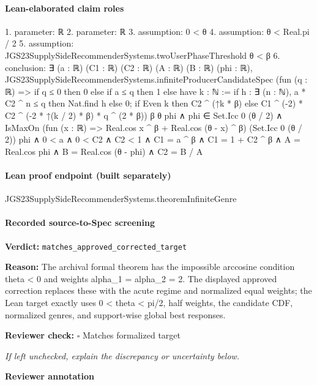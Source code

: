 \documentclass[10pt]{article}
\newcommand{\reviewerbox}{%
  \par\noindent\fbox{\parbox{0.96\linewidth}{\rule{0pt}{0.38in}}}\par
}
\newcommand{\reviewmatch}[1]{%
  \par\noindent\textbf{Reviewer check:} $\square$\; #1\par
  \noindent\emph{If left unchecked, explain the discrepancy or uncertainty below.}\par
}
\begin{document}
\paragraph{Lean-elaborated claim roles}\begin{ReviewVerbatim}
1. parameter: ℝ
2. parameter: ℝ
3. assumption: 0 < θ
4. assumption: θ < Real.pi / 2
5. assumption: JGS23SupplySideRecommenderSystems.twoUserPhaseThreshold θ < β
6. conclusion: ∃ (a : ℝ) (C1 : ℝ) (C2 : ℝ) (A : ℝ) (B : ℝ) (phi : ℝ),
  JGS23SupplySideRecommenderSystems.infiniteProducerCandidateSpec
      (fun (q : ℝ) =>
        if q ≤ 0 then 0
        else
          if a ≤ q then 1
          else
            have k : ℕ := if h : ∃ (n : ℕ), a * C2 ^ n ≤ q then Nat.find h else 0;
            if Even k then C2 ^ (↑k * β) else C1 ^ (-2) * C2 ^ (-2 * ↑(k / 2) * β) * q ^ (2 * β))
      β θ phi ∧
    phi ∈ Set.Icc 0 (θ / 2) ∧
      IsMaxOn (fun (x : ℝ) => Real.cos x ^ β + Real.cos (θ - x) ^ β) (Set.Icc 0 (θ / 2)) phi ∧
        0 < a ∧ 0 < C2 ∧ C2 < 1 ∧ C1 = a ^ β ∧ C1 = 1 + C2 ^ β ∧ A = Real.cos phi ∧ B = Real.cos (θ - phi) ∧ C2 = B / A
\end{ReviewVerbatim}

\paragraph{Lean proof endpoint (built separately)}\begin{ReviewVerbatim}
JGS23SupplySideRecommenderSystems.theoremInfiniteGenre
\end{ReviewVerbatim}

\paragraph{Recorded source-to-Spec screening}
\textbf{Verdict:} \texttt{matches\_approved\_corrected\_target}
\\
{\raggedright
\textbf{Reason:} The archival formal theorem has the impossible arccosine condition theta < 0 and weights alpha\_\allowbreak{}1 = alpha\_\allowbreak{}2 = 2.\allowbreak{} The displayed approved correction replaces these with the acute regime and normalized equal weights;\allowbreak{} the Lean target exactly uses 0 < theta < pi/\allowbreak{}2, half weights, the candidate CDF, normalized genres, and support-\allowbreak{}wise global best responses.\allowbreak{}
\par}
\reviewmatch{Matches formalized target}
\noindent\textbf{Reviewer annotation}\par
\reviewerbox
\clearpage
\hypertarget{source-claim-b7f6390603cba69e}{}
\end{document}
